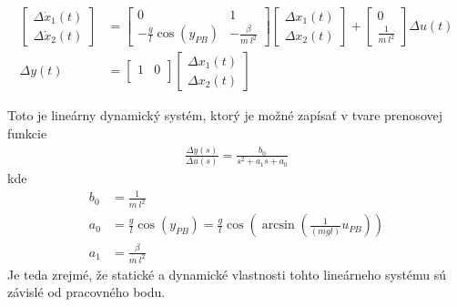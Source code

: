 \documentclass[a4paper, 10pt, ]{article}
\begin{document}
\begin{subequations} \label{stavoplinkyv}
    \begin{align}
    	\begin{bmatrix}
        	  \Delta \dot x_1(t) \\
    		  \Delta \dot x_2(t)
     	\end{bmatrix}
    	&=
    	\begin{bmatrix}
        	0 & 1 \\
        	- \frac{g}{l} \cos \left( y_{PB} \right) & - \frac{\beta}{m\ l^2}
      	\end{bmatrix}
        \begin{bmatrix}
        	  \Delta x_1(t) \\
    		  \Delta x_2(t)
     	\end{bmatrix}
        +
        \begin{bmatrix}
        	  0 \\
    		  \frac{1}{m\ l^2}
     	\end{bmatrix}
        \Delta u(t)
        \\
        \Delta y(t)
        &=
        \begin{bmatrix}
            1 & 0 \\
        \end{bmatrix}
        \begin{bmatrix}
              \Delta x_1(t) \\
              \Delta x_2(t)
        \end{bmatrix}
    \end{align}
\end{subequations}


Toto je lineárny dynamický systém, ktorý je možné zapísať v tvare prenosovej funkcie
\begin{align}
    \frac{\Delta y(s)}{\Delta u(s)} = \frac{b_0}{s^2 + a_1 s + a_0}
\end{align}
kde
\begin{subequations}
    \begin{align}
        b_0 &= \frac{1}{m\ l^2} \\
        a_0 &= \frac{g}{l} \cos \left( y_{PB} \right) = \frac{g}{l} \cos \left( \arcsin \left( \frac{1}{ \left(m g l\right)} u_{PB} \right) \right) \\
        a_1 &= \frac{\beta}{m\ l^2}
    \end{align}
\end{subequations}
Je teda zrejmé, že statické a dynamické vlastnosti tohto lineárneho systému sú závislé od pracovného bodu.
\end{document}
